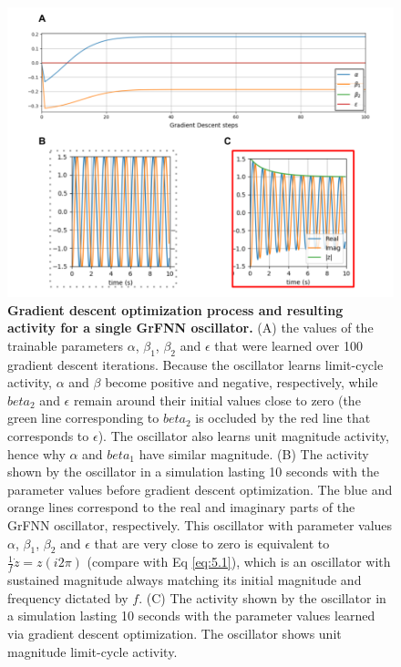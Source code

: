 \documentclass{report}
\begin{document}
\begin{figure}
    \centering
    \includegraphics[width=1.0\textwidth]{figures/fig5_1.png}
    \caption[Gradient descent optimization process and resulting activity for a single GrFNN oscillator]{\textbf{Gradient descent optimization process and resulting activity for a single GrFNN oscillator.} (A) the values of the trainable parameters $\alpha$, $\beta_1$, $\beta_2$ and $\epsilon$ that were learned over 100 gradient descent iterations. Because the oscillator learns limit-cycle activity, $\alpha$ and $\beta$ become positive and negative, respectively, while $beta_2$ and $\epsilon$ remain around their initial values close to zero (the green line corresponding to $beta_2$ is occluded by the red line that corresponds to $\epsilon$). The oscillator also learns unit magnitude activity, hence why $\alpha$ and $beta_1$ have similar magnitude. (B) The activity shown by the oscillator in a simulation lasting 10 seconds with the parameter values before gradient descent optimization. The blue and orange lines correspond to the real and imaginary parts of the GrFNN oscillator, respectively. This oscillator with parameter values $\alpha$, $\beta_1$, $\beta_2$ and $\epsilon$ that are very close to zero is equivalent to $\frac{1}{f}\dot{z}=z(i2\pi)$ (compare with Eq \eqref{eq:5.1}), which is an oscillator with sustained magnitude always matching its initial magnitude and frequency dictated by $f$. (C) The activity shown by the oscillator in a simulation lasting 10 seconds with the parameter values learned via gradient descent optimization. The oscillator shows unit magnitude limit-cycle activity.} 
    \label{f5_1}
\end{figure}
\end{document}
